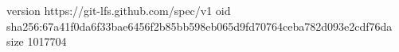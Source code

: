 version https://git-lfs.github.com/spec/v1
oid sha256:67a41f0da6f33bae6456f2b85bb598eb065d9fd70764ceba782d093e2cdf76da
size 1017704
